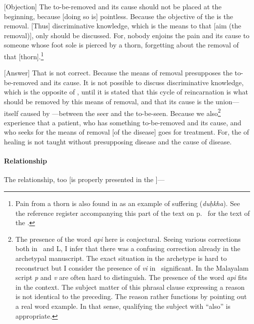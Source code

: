 [Objection]%
 The to-be-removed and its cause should not be
placed at the beginning, because [doing so is] pointless.  Because the
objective of the \sastra\/ is the removal.  [Thus] discriminative
knowledge, which is the means to that [aim (the removal)], only should be
discussed.  For, nobody enjoins the pain and its cause to someone
whose foot sole is pierced by a thorn, forgetting about the removal of
that [thorn].\footnote{Pain from a thorn is also found in  as an
  example of suffering (\emph{duḥkha}).  See the reference register accompanying this part of the text on p.~\pageref{NVKANTHA} for the text of the \NV\@.}

[Answer]%
 That is not correct.  Because the means of removal
presupposes the to-be-removed and its cause.  It is not possible to
discuss discriminative knowledge, which is the opposite of 
\ignorance, until it is stated that this cycle of reincarnation is what 
should be removed by this means of removal, and that its cause is the
union---itself caused by \ignorance---between the seer and the
to-be-seen.  Because we also\footnote{The presence of the word \emph{api} here is conjectural. Seeing various corrections both in \Tm\ and L, I infer that there was a confusing correction already in the archetypal manuscript. The exact situation in the archetype is hard to reconstruct but I consider the presence of \emph{vi} in \Tm\ significant. In the Malayalam script \emph{p} and \emph{v} are often hard to distinguish. The presence of the word \emph{api} fits in the context. The subject matter of this phrasal clause expressing a reason is not identical to the preceding. The reason rather functions by pointing out a real word example. In that sense, qualifying the subject with ``also'' is appropriate.} experience that a patient, who has something
to-be-removed and its cause, and who seeks for the means of removal
[of the disease] goes for treatment.  For, the \sastra\/ of healing is not taught without presupposing disease and the cause of disease.

\paragraph{Relationship}
The%
 relationship, too [is properly presented in the \sastra]---

